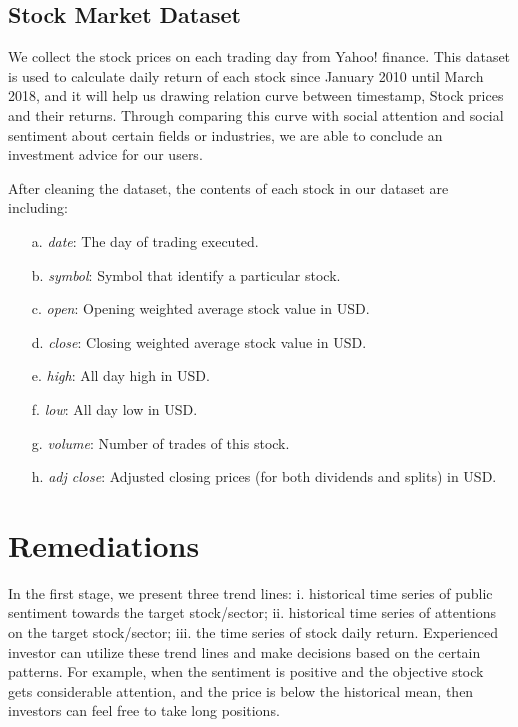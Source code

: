 \documentclass[conference]{IEEEtran}
\begin{document}
\subsection{Stock Market Dataset}
We collect the stock prices on each trading day from Yahoo! finance. This dataset is used to calculate daily return of each stock since January 2010 until March 2018, and it will help us drawing relation curve between timestamp, Stock prices and their returns. Through comparing this curve with social attention and social sentiment about certain fields or industries, we are able to conclude an investment advice for our users.

After cleaning the dataset, the contents of each stock in our dataset are including:
\begin{itemize}
    \item[a.] \textit{date}: The day of trading executed.
    \item[b.] \textit{symbol}: Symbol that identify a particular stock.
    \item[c.] \textit{open}: Opening weighted average stock value in USD.
    \item[d.] \textit{close}: Closing weighted average stock value in USD. 
    \item[e.] \textit{high}: All day high in USD.
    \item[f.] \textit{low}: All day low in USD.
    \item[g.] \textit{volume}: Number of trades of this stock.
    \item[h.] \textit{adj close}: Adjusted closing prices (for both dividends and splits) in USD.
\end{itemize}
\vspace{1.0em}

\section{Remediations}\label{Remediations}
In the first stage, we present three trend lines: i. historical time series of public sentiment towards the target stock/sector; ii. historical time series of attentions on the target stock/sector; iii. the time series of stock daily return. Experienced investor can utilize these trend lines and make decisions based on the certain patterns. For example, when the sentiment is positive and the objective stock gets considerable attention, and the price is below the historical mean, then investors can feel free to take long positions.
\end{document}

